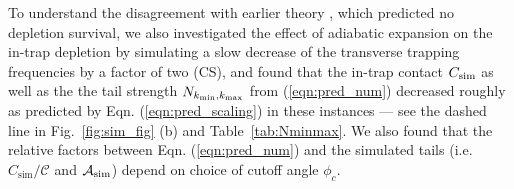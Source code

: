 	To understand the disagreement with earlier theory \cite{Qu16}, which predicted no depletion survival, we also investigated the effect of adiabatic expansion on the in-trap depletion by simulating a slow decrease of the transverse trapping frequencies by a factor of two (CS), and found that the in-trap contact {$C_{\rm sim}$ as well as the the tail strength $N_{k_{\rm min},k_{\rm max}}$ from (\ref{eqn:pred_num})} 
	decreased roughly as predicted by Eqn. (\ref{eqn:pred_scaling}) in these instances --- see the dashed line in Fig.~\ref{fig:sim_fig} (b) {and Table~\ref{tab:Nminmax}.} 
	We also found that the relative factors between Eqn. (\ref{eqn:pred_num}) and the simulated tails (i.e. $C_\textrm{sim}/\mathcal{C}$ {and $\mathcal{A}_{\rm sim}$) depend} on choice of cutoff angle $\phi_c$. 
